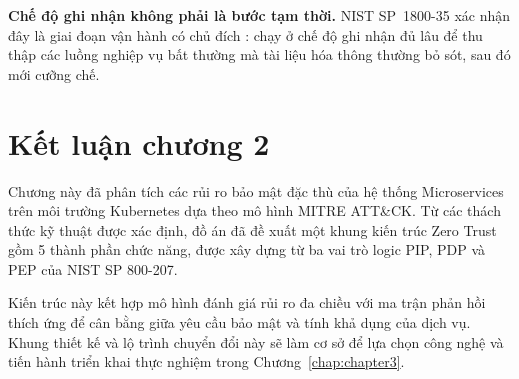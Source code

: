 \textbf{Chế độ ghi nhận không phải là bước tạm thời.} NIST SP~1800-35 xác nhận đây là giai đoạn vận hành có chủ đích \parencite{nist_sp_1800_35}: chạy ở chế độ ghi nhận đủ lâu để thu thập các luồng nghiệp vụ bất thường mà tài liệu hóa thông thường bỏ sót, sau đó mới cưỡng chế.

\section*{Kết luận chương 2}

Chương này đã phân tích các rủi ro bảo mật đặc thù của hệ thống Microservices trên môi trường Kubernetes dựa theo mô hình MITRE ATT\&CK. Từ các thách thức kỹ thuật được xác định, đồ án đã đề xuất một khung kiến trúc Zero Trust gồm 5 thành phần chức năng, được xây dựng từ ba vai trò logic PIP, PDP và PEP của NIST SP 800-207.

Kiến trúc này kết hợp mô hình đánh giá rủi ro đa chiều với ma trận phản hồi thích ứng để cân bằng giữa yêu cầu bảo mật và tính khả dụng của dịch vụ. Khung thiết kế và lộ trình chuyển đổi này sẽ làm cơ sở để lựa chọn công nghệ và tiến hành triển khai thực nghiệm trong Chương~\ref{chap:chapter3}.
